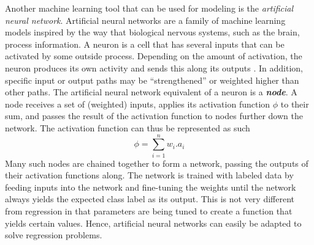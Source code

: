 %
Another machine learning tool that can be used for modeling is the \textit{artificial neural network}. Artificial neural networks are a family of machine learning models inspired by the way that biological nervous systems, such as the brain, process information. A neuron is a cell that has several inputs that can be activated by some outside process. Depending on the amount of activation, the neuron produces its own activity and sends this along its outputs \cite{REF20}. In addition, specific input or output paths may be ``strengthened'' or weighted higher than other paths. The artificial neural network equivalent of a neuron is a \textit{\textbf{node}}. A node receives a set of (weighted) inputs, applies its activation function $\phi$ to their sum, and passes the result of the activation function to nodes further down the network. The activation function can thus be represented as such
\begin{equation}
\phi = \sum_{i=1}^{n} w_i.a_i
\end{equation}
Many such nodes are chained together to form a network, passing the outputs of their activation functions along. The network is trained with labeled data by feeding inputs into the network and fine-tuning the weights until the network always yields the expected class label as its output. This is not very different from regression in that parameters are being tuned to create a function that yields certain values. Hence, artificial neural networks can easily be adapted to solve regression problems.

\bigskip


\goodbreak

